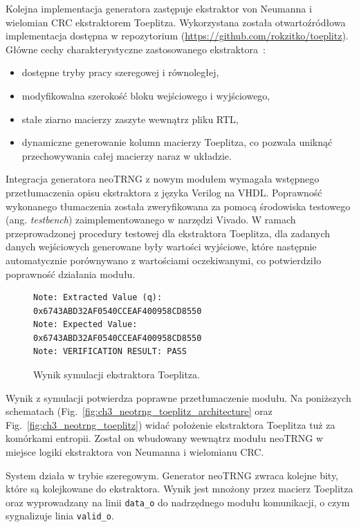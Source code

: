 \noindent Kolejna implementacja generatora zastępuje ekstraktor von Neumanna 
i wielomian CRC ekstraktorem Toeplitza. Wykorzystana została otwartoźródłowa 
implementacja dostępna w repozytorium (\url{https://github.com/rokzitko/toeplitz}). 
Główne cechy charakterystyczne zastosowanego ekstraktora~\cite{topelitz-rok-zitko}:

\begin{itemize}
  \item dostępne tryby pracy szeregowej i równoległej,
  \item modyfikowalna szerokość bloku wejściowego i wyjściowego,
  \item stałe ziarno macierzy zaszyte wewnątrz pliku RTL,
  \item dynamiczne generowanie kolumn macierzy Toeplitza, co pozwala uniknąć 
  przechowywania całej macierzy naraz w układzie.
\end{itemize}

Integracja generatora neoTRNG z nowym modułem wymagała wstępnego przetłumaczenia 
opisu ekstraktora z języka Verilog na VHDL. Poprawność wykonanego tłumaczenia 
została zweryfikowana za pomocą środowiska testowego (ang. \textit{testbench}) 
zaimplementowanego w narzędzi Vivado. W ramach przeprowadzonej procedury 
testowej dla ekstraktora Toeplitza, dla zadanych danych wejściowych generowane 
były wartości wyjściowe, które następnie automatycznie porównywano z 
wartościami oczekiwanymi, co potwierdziło poprawność działania modułu.

\begin{figure}[H]
    \centering
    \begin{verbatim}
Note: Extracted Value (q): 0x6743ABD32AF0540CCEAF400958CD8550
Note: Expected Value:      0x6743ABD32AF0540CCEAF400958CD8550
Note: VERIFICATION RESULT: PASS
    \end{verbatim}
    \caption{Wynik symulacji ekstraktora Toeplitza.}
    \label{fig:ch3_toeplitz_testbench_result}
\end{figure}

Wynik z symulacji potwierdza poprawne przetłumaczenie modułu. Na poniższych 
schematach (Fig.~\ref{fig:ch3_neotrng_toeplitz_architecture} oraz 
Fig.~\ref{fig:ch3_neotrng_toeplitz}) widać położenie ekstraktora Toeplitza 
tuż za komórkami entropii. Został on wbudowany wewnątrz modułu neoTRNG w 
miejsce logiki ekstraktora von Neumanna i wielomianu CRC. 

System działa w trybie szeregowym. Generator neoTRNG zwraca kolejne bity, które są 
kolejkowane do ekstraktora. Wynik jest mnożony przez macierz Toeplitza oraz 
wyprowadzany na linii \texttt{data\_o} do nadrzędnego modułu komunikacji, o czym 
sygnalizuje linia \texttt{valid\_o}.  

